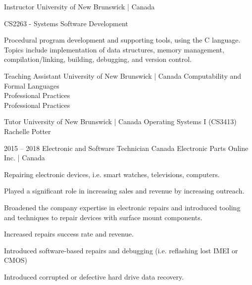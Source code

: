 \documentclass[9.5pt]{developercv} %
\begin{document}
\begin{entrylist}
        {Instructor}
        {University of New Brunswick | Canada}{ 
            \textbullet{} CS2263 - Systems Software Development
            \begin{quoting}
            Procedural program development and supporting tools, using the C language. 
            Topics include implementation of data structures, memory management, compilation/linking, building, debugging, and version control. 
            \end{quoting}
            }

        {Teaching Assistant}
        {University of New Brunswick | Canada}
        {        
            \textbullet{} Computability and Formal Languages\\
            \textbullet{} Professional Practices\\
            \textbullet{} Professional Practices\\
            }

        {Tutor}
        {University of New Brunswick | Canada}{        
            \textbullet{} Operating Systems I (CS3413) Rachelle Potter
            }
            
    \entry
        {2015 -- 2018}
        {Electronic and Software Technician}
        {Canada Electronic Parts Online Inc. | Canada}{  
            Repairing electronic devices, i.e. smart watches, televisions, computers.
            \begin{tightemize}
            \item Played a significant role in increasing sales and revenue by increasing outreach.
            \item Broadened the company expertise in electronic repairs and introduced tooling and techniques to repair devices with surface mount components.
            \item Increased repairs success rate and revenue.
            \item Introduced software-based repairs and debugging (i.e. reflashing lost IMEI or CMOS)
            \item Introduced corrupted or defective hard drive data recovery.
            \end{tightemize}
            }

\end{entrylist}
\end{document}
